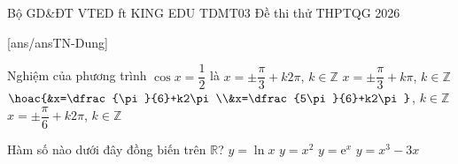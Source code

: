 \def\linkdethi{} %
\anmaQR
\def\toanlop{12}
\def\thoigian{90}
\def\namhoc{2025 - 2026}
\begin{dethi}
	{Bộ GD\&ĐT}
	{VTED ft KING EDU}
	{TDMT03}
	{Đề thi thử THPTQG 2026}
\end{dethi}
\caulc
{}[ans/ansTN-Dung]
\begin{ex}%
	Nghiệm của phương trình $\cos x=\dfrac{1}{2}$ là
	\choice
	{\True $x=\pm\dfrac{\pi}{3}+k2\pi$, $k\in\mathbb{Z}$}
	{$x=\pm\dfrac{\pi}{3}+k\pi$, $k\in\mathbb{Z}$}
	{$\hoac{&x=\dfrac{\pi}{6}+k2\pi\\&x=\dfrac{5\pi}{6}+k2\pi}$, $k\in\mathbb{Z}$}
	{$x=\pm\dfrac{\pi}{6}+k2\pi$, $k\in\mathbb{Z}$}
\end{ex}

\begin{ex}%
	Hàm số nào dưới đây đồng biến trên $\mathbb{R}$?
	\choice
	{$y=\ln x$}
	{$y=x^2$}
	{\True $y=\mathrm{e}^x$}
	{$y=x^3-3x$}
\end{ex}

